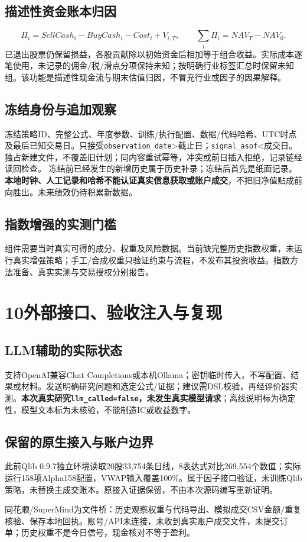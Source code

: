 \documentclass[UTF8,a4paper,10pt]{ctexart}
\newcommand{\page}[1]{\newpage\section*{#1}}
\begin{document}
\subsection*{描述性资金账本归因}
\[
\Pi_i=SellCash_i-BuyCash_i-Cost_i+V_{i,T},\qquad \sum_i\Pi_i=NAV_T-NAV_0.
\]
已退出股票仍保留损益，各股贡献除以初始资金后相加等于组合收益。实际成本逐笔使用，未记录的佣金/税/滑点分项保持未知；按明确行业标签汇总时保留未知组。该功能是描述性现金流与期末估值归因，不冒充行业或因子的因果解释。
\subsection*{冻结身份与追加观察}
冻结策略ID、完整公式、年度参数、训练/执行配置、数据/代码哈希、UTC时点及最后已知交易日。只接受\texttt{observation\_date}>截止日；\texttt{signal\_asof}<成交日。独占新建文件，不覆盖旧计划；同内容重试幂等，冲突或前日插入拒绝，记录链经读回检查。
冻结前已经发生的新增历史属于历史补录；冻结后首先是纸面记录。\textbf{本地时钟、人工记录和哈希不能认证真实信息获取或账户成交}，不把旧净值贴成前向胜出。未来绩效仍待积累新数据。
\subsection*{指数增强的实测门槛}
组件需要当时真实可得的成分、权重及风险数据。当前缺完整历史指数权重，未运行真实增强策略；手工/合成权重只验证约束与流程，不发布其投资收益。指数方法准备、真实实测与交易授权分别报告。

\page{10\quad 外部接口、验收注入与复现}

\subsection*{LLM辅助的实际状态}
支持OpenAI兼容Chat Completions或本机Ollama；密钥临时传入，不写配置、结果或材料。发送明确研究问题和选定公式/证据；建议需DSL校验，再经评价器实测。\textbf{本次真实研究\texttt{llm\_called=false}，未发生真实模型请求}；离线说明标为确定性，模型文本标为未核验，不能制造IC或收益数字。
\subsection*{保留的原生接入与账户边界}
此前Qlib 0.9.7独立环境读取20股33,754条日线，8表达式对比269,554个数值；实际运行158项Alpha158配置，VWAP输入覆盖100\%。属于因子接口验证，未训练Qlib策略，未替换主成交账本。原接入证据保留，不由本次源码编写重新证明。

同花顺/SuperMind为文件桥：历史观察权重与代码导出、模拟成交CSV金额/重复核验、保存本地回执。账号/API未连接，未收到真实账户成交文件，未提交订单；历史权重不是今日信号，现金核对不等于盈利。
\end{document}
